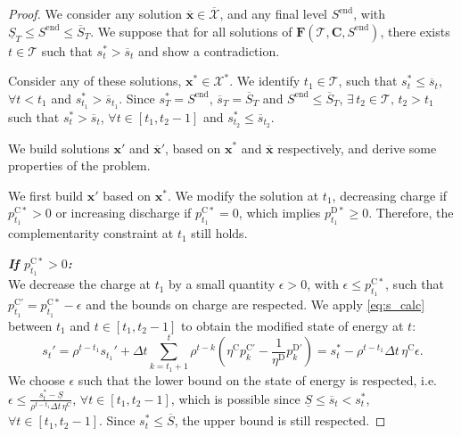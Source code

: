 \documentclass[10pt,a4paper]{amsart}
\newcommand{\up}[1]{^{\mathrm{#1}}}
\begin{document}
\begin{proof}
    We consider any solution $\mathbf{\overline{x}} \in \overline{\mathcal{X}}$, and any final level $S\up{end}$, with $\underline{S}_T \leq S\up{end} \leq \overline{S}_T$.
    We suppose that for all solutions of $\textbf{F}(\mathcal{T}, \textbf{C}, S\up{end})$, there exists $t \in \mathcal{T}$ such that $s_{t}^* > \overline{s}_t$ and show a contradiction.
    
    Consider any of these solutions, $\mathbf{x}^* \in \mathcal{X}^*$.
    We identify $t_1 \in \mathcal{T}$, such that $s_{t}^* \leq \overline{s}_{t}$, $\forall t < t_1$ and $s_{t_1}^* > \overline{s}_{t_1}$.
    Since $s_T^* = S\up{end}$, $\overline{s}_T = \overline{S}_T$ and $S\up{end} \leq \overline{S}_T$, $\exists \, t_2 \in \mathcal{T}, \, t_2> t_1$ such that $s_{t}^* > \overline{s}_{t}$, $\forall t \in [t_1, t_2-1]$ and $s_{t_2}^* \leq \overline{s}_{t_2}$.

    We build solutions $\mathbf{x}'$ and $\overline{\mathbf{x}}'$, based on $\mathbf{x}^*$ and $\overline{\mathbf{x}}$ respectively, and derive some properties of the problem.

    We first build $\mathbf{x}'$ based on $\mathbf{x}^*$. We modify the solution at $t_1$, decreasing charge if $p\up{C*}_{t_1}>0$ or increasing discharge if $p\up{C*}_{t_1}=0$, which implies $p\up{D*}_{t_1}\geq0$. Therefore, the complementarity constraint at $t_1$ still holds.

    \textit{\textbf{If $p\up{C*}_{t_1}>0$:}} \\ 
    We decrease the charge at $t_1$ by a small quantity ${\epsilon} > 0$, with ${\epsilon} \leq {p}\up{C*}_{t_1}$, such that ${p}\up{C'}_{t_1}={p}\up{C*}_{t_1}-{\epsilon}$ and the bounds on charge are respected.
    We apply \eqref{eq:s_calc} between $t_1$ and $t \in [t_1,t_2-1]$ to obtain the modified state of energy at $t$:
    \begin{equation}
        {s}_t' = \rho^{t - t_1} s_{t_1}' + \Delta t \sum_{k=t_1+1}^{t} \rho^{t - k} \left( \eta\up{C} p_k\up{C'} - \frac{1}{\eta\up{D}} p_k\up{D'} \right) = {s}_t^* - \rho^{t - t_1} \Delta t \, \eta\up{C} {\epsilon}.
    \end{equation}
    We choose ${\epsilon}$ such that the lower bound on the state of energy is respected, i.e. ${\epsilon} \leq \frac{{s}_t^* - \underline{S}}{\rho^{t - t_1} \Delta t \, \eta\up{C}}$, $\forall t \in [t_1,t_2-1]$, which is possible since $\underline{S} \leq \overline{s}_t < s_t^*$, $ \forall t \in [t_1,t_2-1]$. 
    Since ${s}_t^* \leq \overline{S}$, the upper bound is still respected.


\end{proof}
\end{document}
